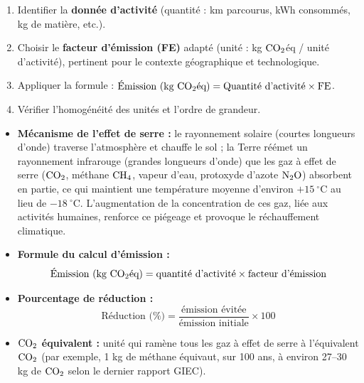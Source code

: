 \documentclass[11pt]{article}
\begin{document}
\begin{methode}
\begin{enumerate}
\item Identifier la \textbf{donnée d'activité} (quantité : km parcourus, kWh consommés, kg de matière, etc.).
\item Choisir le \textbf{facteur d'émission (FE)} adapté (unité : kg $\ce{CO2}$éq / unité d'activité), pertinent pour le contexte géographique et technologique.
\item Appliquer la formule : $\displaystyle \text{Émission (kg $\ce{CO2}$éq)} = \text{Quantité d'activité} \times \text{FE}$.
\item Vérifier l'homogénéité des unités et l'ordre de grandeur.
\end{enumerate}
\end{methode}

\begin{aretenir}
\begin{itemize}
\item \textbf{Mécanisme de l'effet de serre :} le rayonnement solaire (courtes longueurs d'onde) traverse l'atmosphère et chauffe le sol ; la Terre réémet un rayonnement infrarouge (grandes longueurs d'onde) que les gaz à effet de serre ($\ce{CO2}$, méthane $\ce{CH4}$, vapeur d'eau, protoxyde d'azote $\ce{N2O}$) absorbent en partie, ce qui maintient une température moyenne d'environ $+15~^\circ\mathrm{C}$ au lieu de $-18~^\circ\mathrm{C}$. L'augmentation de la concentration de ces gaz, liée aux activités humaines, renforce ce piégeage et provoque le réchauffement climatique.
\item \textbf{Formule du calcul d'émission :}
\[ \text{Émission (kg $\ce{CO2}$éq)} = \text{quantité d'activité} \times \text{facteur d'émission} \]
\item \textbf{Pourcentage de réduction :}
\[ \text{Réduction (\%)} = \frac{\text{émission évitée}}{\text{émission initiale}} \times 100 \]
\item \textbf{$\ce{CO2}$ équivalent :} unité qui ramène tous les gaz à effet de serre à l'équivalent $\ce{CO2}$ (par exemple, 1 kg de méthane équivaut, sur 100 ans, à environ 27--30 kg de $\ce{CO2}$ selon le dernier rapport GIEC).
\end{itemize}
\end{aretenir}
\end{document}

